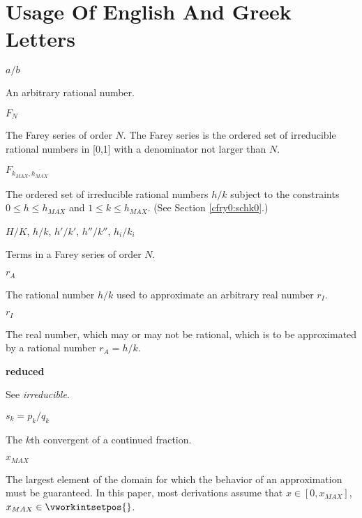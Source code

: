 
\section*{Usage Of English And Greek Letters}

\begin{vworkmathtermglossaryenum}

\item \mbox {\boldmath $a/b$}

      An arbitrary rational number.

\item \mbox {\boldmath $ F_N $}

      The Farey 
      series of order $N$.  The Farey series is the
      ordered set of irreducible rational numbers 
	  in [0,1] with a
      denominator not larger than $N$.

\item \mbox {\boldmath $F_{k_{MAX}, \overline{h_{MAX}}}$}
      
	  The ordered set of irreducible rational numbers
	  $h/k$ subject to the constraints $0 \leq h \leq h_{MAX}$
	  and $1 \leq k \leq h_{MAX}$.  
	  (See Section \cfryzeroxrefhyphen{}\ref{cfry0:schk0}.)


\item \mbox{\boldmath $H/K$}, \mbox{\boldmath $h/k$},
      \mbox{\boldmath $h'/k'$}, \mbox{\boldmath $h''/k''$},
      \mbox{\boldmath $h_i/k_i$}

      Terms in a Farey series of order $N$.

\item \mbox{\boldmath $r_A$}

      The rational number $h/k$ used to approximate
      an arbitrary real number $r_I$.

\item \mbox{\boldmath $r_I$}

      The real number, which may or may not be rational,
      which is to be approximated by a rational number
      $r_A = h/k$.

\item \textbf{reduced}

      See \emph{irreducible}.

\item \mbox{\boldmath $s_k = p_k/q_k$}

      The $k$th convergent of a continued fraction.

\item \mbox{\boldmath $x_{MAX}$}

      The largest element of the domain for which the
      behavior of an approximation must be guaranteed.
      In this paper, most derivations assume
      that $x \in [0, x_{MAX}]$, $x_{MAX} \in \vworkintsetpos{}$.
\end{vworkmathtermglossaryenum}


